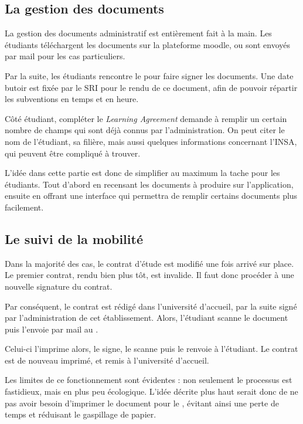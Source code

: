		\subsection{La gestion  des documents}
		La gestion des documents administratif est entièrement fait à la main. Les étudiants téléchargent les documents sur la plateforme moodle, ou sont envoyés par mail pour les cas particuliers. 
                
                Par la suite, les étudiants rencontre le \ri pour faire signer les documents. Une date butoir est fixée par le SRI pour le rendu de ce document, afin de pouvoir répartir les subventions en temps et en heure. 

\medbreak

Côté étudiant, compléter le \textit{Learning Agreement} demande à remplir un certain nombre de champs qui sont déjà connus par l'administration. On peut citer le nom de l'étudiant, sa filière, mais aussi quelques informations concernant l'INSA, qui peuvent être compliqué à trouver. 

\medbreak

L'idée dans cette partie est donc de simplifier au maximum la tache pour les étudiants. Tout d'abord en recensant les documents à produire sur l'application, ensuite en offrant une interface qui permettra de remplir certains documents plus facilement. 

\subsection{Le suivi de la mobilité}

Dans la majorité des cas, le contrat d'étude est modifié une fois arrivé sur place. Le premier contrat, rendu bien plus tôt, est invalide. Il faut donc procéder à une nouvelle signature du contrat. 

Par conséquent, le contrat est rédigé dans l'université d'accueil, par la suite  signé par l'administration de cet établissement. Alors, l'étudiant scanne  le document puis l'envoie par mail au \ri. 

Celui-ci l'imprime alors, le signe, le scanne puis le renvoie à l'étudiant. Le contrat est  de nouveau imprimé, et remis à l'université d'accueil. 

\medbreak

Les limites de ce fonctionnement sont évidentes : non seulement le processus est fastidieux, mais en plus peu écologique. L'idée décrite plus haut serait donc de ne pas avoir besoin d'imprimer le document pour le \ri, évitant ainsi une perte de temps et réduisant le gaspillage de papier. 

